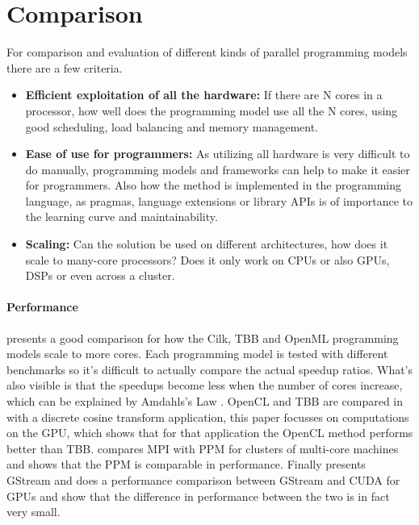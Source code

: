 \section{Comparison}



For comparison and evaluation of different kinds of parallel programming
models there are a few criteria.

\begin{itemize}
	\item \textbf{Efficient exploitation of all the hardware:} If there are N
		cores in a processor, how well does the programming model use all the N
		cores, using good scheduling, load balancing and memory management.
	\item \textbf{Ease of use for programmers:} As utilizing all hardware is
		very difficult to do manually, programming models and frameworks can
		help to make it easier for programmers. Also how the
		method is implemented in the programming language, as pragmas, language
		extensions or library APIs is of importance to the learning curve and maintainability.
	\item \textbf{Scaling:} Can the solution be used on different
		architectures, how does it scale to many-core processors? Does it only
		work on CPUs or also GPUs, DSPs or even across a cluster. 
\end{itemize}

\paragraph{Performance} \cite{CaoPerformanceAnalysis} presents a good
comparison for how the Cilk, TBB and OpenML programming models scale to more
cores. Each programming model is tested with different benchmarks so it's
difficult to actually compare the actual speedup ratios. What's also visible is
that the speedups become less when the number of cores increase, which can be
explained by Amdahls's Law \cite{hennessy2007computer}. OpenCL and TBB are
compared in \cite{KimExploitingMultiManyCore} with a discrete cosine transform
application, this paper focusses on computations on the GPU, which shows that
for that application the OpenCL method performs better than TBB.
\cite{BrightwellParallelPhaseModel} compares MPI with PPM for clusters of
multi-core machines and shows that the PPM is comparable in performance.
Finally \cite{ZhangDataParallelProgramming} presents GStream and does a
performance comparison between GStream and CUDA for GPUs and show that the
difference in performance between the two is in fact very small.

